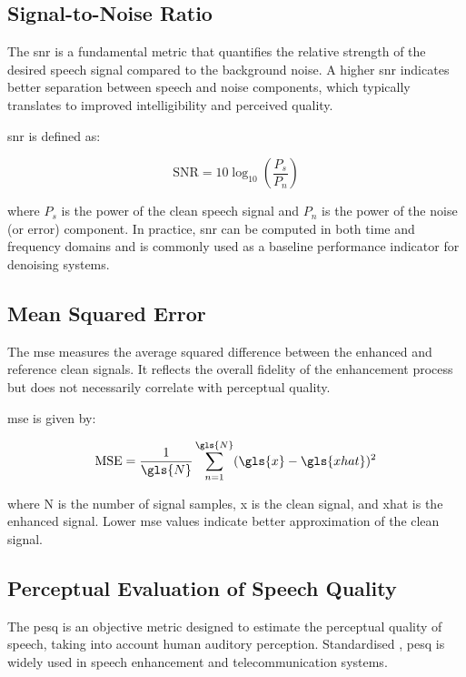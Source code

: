 \subsection{Signal-to-Noise Ratio}
\label{subsec:snr}

The \gls{snr} is a fundamental metric that quantifies the relative strength of the desired speech signal compared to the background noise. A higher \gls{snr} indicates better separation between speech and noise components, which typically translates to improved intelligibility and perceived quality.

\gls{snr} is defined as:

\begin{equation}
    \text{SNR} = 10 \log_{10} \left( \frac{P_s}{P_n} \right)
\end{equation}

where \( P_s \) is the power of the clean speech signal and \( P_n \) is the power of the noise (or error) component. In practice, \gls{snr} can be computed in both time and frequency domains and is commonly used as a baseline performance indicator for denoising systems.

\subsection{Mean Squared Error}
\label{subsec:mse}

The \gls{mse} measures the average squared difference between the enhanced and reference clean signals. It reflects the overall fidelity of the enhancement process but does not necessarily correlate with perceptual quality.

\gls{mse} is given by:

\begin{equation}
    \text{MSE} = \frac{1}{\gls{N}} \sum_{n=1}^{\gls{N}} (\gls{x} - \gls{xhat})^2
\end{equation}

where \gls{N} is the number of signal samples, \gls{x} is the clean signal, and \gls{xhat} is the enhanced signal. Lower \gls{mse} values indicate better approximation of the clean signal.

\subsection{Perceptual Evaluation of Speech Quality}
\label{subsec:pesq}

The \gls{pesq} is an objective metric designed to estimate the perceptual quality of speech, taking into account human auditory perception. Standardised \cite{itutp862}, \gls{pesq} is widely used in speech enhancement and telecommunication systems.

